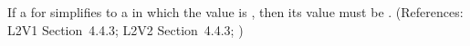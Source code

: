 If a \UnitDefinition for  simplifies to a \Unit in which the
  value is , then its
  value must be . (References:
L2V1 Section~4.4.3; L2V2 Section~4.4.3; )
